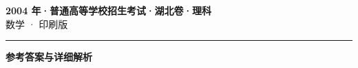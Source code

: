 \documentclass[zihao=5, a4paper]{ctexart}
\begin{document}
\begin{center}
  {\Large\bfseries 2004 年·普通高等学校招生考试·湖北卷·理科}\\[4pt]
  {\large 数学 · 印刷版}
\end{center}
\medskip
{}

\par\bigskip\hrule\bigskip
{}
\begin{center}{\large\bfseries 参考答案与详细解析}\end{center}
\smallskip

\end{document}
